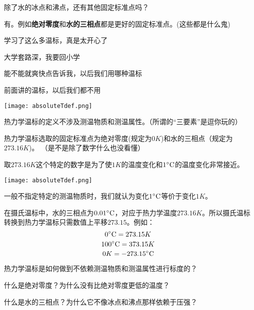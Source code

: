 \documentclass[CJK]{beamer}
\begin{document}
\begin{frame}
\bch
除了水的冰点和沸点，还有其他固定标准点吗？

\skipline

\bitem
\item{有。例如{\bf 绝对零度}和{\bf 水的三相点}都是更好的固定标准点。(\wulian 这些都是什么鬼)}
\eitem

\ech
\end{frame}

\begin{frame}
\bch
学习了这么多温标，真是太开心了\wulian

\skiplines

大学套路深，我要回小学\wulian

\skiplines

能不能就爽快点告诉我，以后我们用哪种温标\wulian

\ech
\end{frame}


\begin{frame}
\bch
前面讲的温标，以后我们都不用\bye
\ech
\end{frame}

\begin{frame}
\bch

\texttt{[image: absoluteTdef.png]}
\bitem
\item{热力学温标的定义不涉及测温物质和测温属性。{\small \darkgray（所谓的“三要素”是逗你玩的\bye）}}
\item{热力学温标选取的固定标准点为绝对零度(规定为$0K$)和水的三相点（规定为$273.16K$)。 {\small \darkgray（是不是除了数字什么也没看懂\bye）}}
\eitem

{\small
取$273.16K$这个特定的数字是为了使$1K$的温度变化和$1^\circ \mathrm{C}$的温度变化非常接近。}
\ech
\end{frame}


\begin{frame}
\bch
\texttt{[image: absoluteTdef.png]}

一般不指定特定的测温物质时，我们就认为变化$1^\circ \mathrm{C}$等价于变化$1K$。 

在摄氏温标中，水的三相点为$0.01^\circ \mathrm{C}$，对应于热力学温度$273.16K$。所以摄氏温标转换到热力学温标只需数值上平移$273.15$。例如： 
$$0^\circ \mathrm{C} = 273.15 K$$
$$100^\circ \mathrm{C} = 373.15K$$
$$0K = -273.15 ^\circ \mathrm{C}$$
\ech
\end{frame}

\begin{frame}
\bch
\bitem
\item{热力学温标是如何做到不依赖测温物质和测温属性进行标度的？}
\item{什么是绝对零度？为什么没有比绝对零度更低的温度？}
\item{什么是水的三相点？为什么它不像冰点和沸点那样依赖于压强？}
\eitem
\ech
\end{frame}
\end{document}
